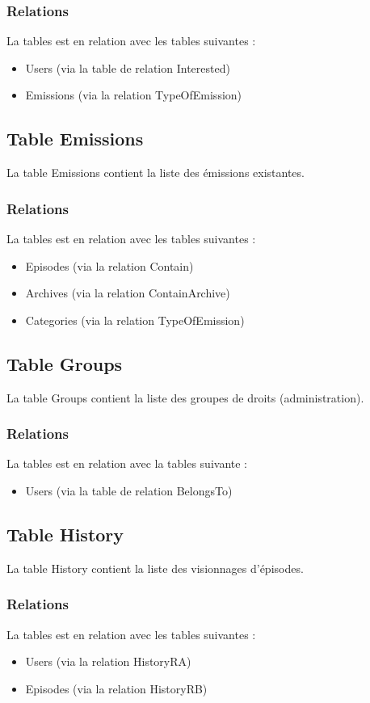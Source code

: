 \documentclass[12pt]{article}
\begin{document}
\subsubsection{Relations}
La tables est en relation avec les tables suivantes :
\begin{itemize}
\item Users (via la table de relation Interested)
\item Emissions (via la relation TypeOfEmission)
\end{itemize}

\subsection{Table Emissions}
La table Emissions contient la liste des émissions existantes.
\subsubsection{Relations}
La tables est en relation avec les tables suivantes :
\begin{itemize}
\item Episodes (via la relation Contain)
\item Archives (via la relation ContainArchive)
\item Categories (via la relation TypeOfEmission)
\end{itemize}

\subsection{Table Groups}
La table Groups contient la liste des groupes de droits (administration).
\subsubsection{Relations}
La tables est en relation avec la tables suivante :
\begin{itemize}
\item Users (via la table de relation BelongsTo)
\end{itemize}

\subsection{Table History}
La table History contient la liste des visionnages d'épisodes.
\subsubsection{Relations}
La tables est en relation avec les tables suivantes :
\begin{itemize}
\item Users (via la relation HistoryRA)
\item Episodes (via la relation HistoryRB)
\end{itemize}
\end{document}

